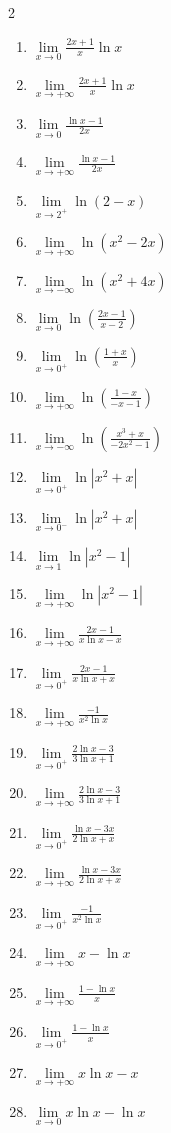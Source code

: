 \documentclass[12pt,a4paper]{article}
\begin{document}
\begin{multicols}{2}
\begin{enumerate}
\item $\lim\limits_{x \to 0} \frac{2x + 1}{x} \ln x $
\item $ \lim\limits_{x \to +\infty} \frac{2x + 1}{x} \ln x  $
\item $ \lim\limits_{x \to 0} \frac{\ln x - 1}{2x} $
\item $ \lim\limits_{x \to +\infty} \frac{\ln x - 1}{2x} $
\item $ \lim\limits_{x \to 2^+} \ln(2 - x)$


\item $ \lim\limits_{x \to +\infty} \ln(x^2 - 2x) $
\item $ \lim\limits_{x \to -\infty} \ln(x^2 + 4x) $
\item $ \lim\limits_{x \to 0} \ln\left(\frac{2x - 1}{x - 2}\right) $
\item $ \lim\limits_{x \to 0^+} \ln\left(\frac{1 + x}{x}\right) $



\item $ \lim\limits_{x \to +\infty} \ln\left(\frac{1 - x}{-x - 1}\right) $
\item $ \lim\limits_{x \to -\infty} \ln\left(\frac{x^3 + x}{-2x^2 - 1}\right) $
\item $ \lim\limits_{x \to 0^+} \ln|x^2 + x| $
\item $ \lim\limits_{x \to 0^-} \ln|x^2 + x| $



\item $ \lim\limits_{x \to 1} \ln|x^2 - 1| $
\item $ \lim\limits_{x \to +\infty} \ln|x^2 - 1| $
\item $ \lim\limits_{x \to +\infty} \frac{2x - 1}{x \ln x - x} $
\item $ \lim\limits_{x \to 0^+} \frac{2x - 1}{x \ln x + x} $
\item $ \lim\limits_{x \to +\infty} \frac{-1}{x^2 \ln x} $

\item $ \lim\limits_{x \to 0^+} \frac{2\ln x - 3}{3\ln x + 1} $
\item $ \lim\limits_{x \to +\infty} \frac{2\ln x - 3}{3\ln x + 1} $
\item $ \lim\limits_{x \to 0^+} \frac{\ln x - 3x}{2\ln x + x} $
\item $ \lim\limits_{x \to +\infty} \frac{\ln x - 3x}{2\ln x + x} $
\item $ \lim\limits_{x \to 0^+} \frac{-1}{x^2 \ln x} $


\item $ \lim\limits_{x \to +\infty} x - \ln x $
\item $ \lim\limits_{x \to +\infty} \frac{1 - \ln x}{x} $ 
\item $ \lim\limits_{x \to 0^+} \frac{1 - \ln x}{x} $
\item $ \lim\limits_{x \to +\infty} x \ln x - x $ 
\item $ \lim\limits_{x \to 0} x \ln x - \ln x $


\end{enumerate}
\end{multicols}
\end{document}
